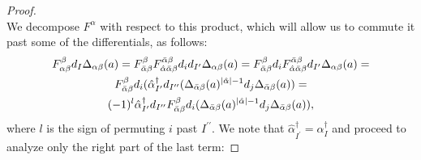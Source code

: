 \begin{cor}
\begin{proof}
\begin{equation*}
  \end{equation*}
  We decompose $F^\alpha$ with respect to this product, which will allow us to commute it past some of the differentials, as follows:\\
  \begin{gather*}
    F_{\alpha\beta}^\beta d_I \Delta_{\alpha\beta}(a) = %
    F_{\bar\alpha\beta}^{\beta} F^{\bar\alpha\beta}_{\hat\alpha\bar\alpha\beta} d_i  d_{I^\prime} \Delta_{\alpha\beta}(a) = %
    F_{\bar\alpha\beta}^{\beta} d_i F^{\bar\alpha\beta}_{\hat\alpha\bar\alpha\beta}%
      d_{I^\prime} \Delta_{\alpha\beta}(a) = \\%
    F_{\bar\alpha\beta}^{\beta} d_i ( \hat\alpha^\dagger_{I^\prime} d_{I^{\prime\prime}}%
      ( \Delta_{\bar\alpha\beta}(a)^{\abs{\hat\alpha}-1} %
      d_j \Delta_{\bar\alpha\beta}(a) ) = \\%
    (-1)^l \hat\alpha^\dagger_{I^\prime} d_{I^{\prime\prime}} F_{\bar\alpha\beta}^\beta %
      d_i ( \Delta_{\bar\alpha\beta}(a)^{\abs{\hat\alpha}-1} %
      d_j \Delta_{\bar\alpha\beta}(a) ),%
  \end{gather*}
  where $l$ is the sign of permuting $i$ past $I^{\prime\prime}$. We note that $\hat\alpha^\dagger_{I^\prime} = \alpha^\dagger_I$ and proceed to analyze only the right part of the last term:

\end{proof}
\end{cor}
